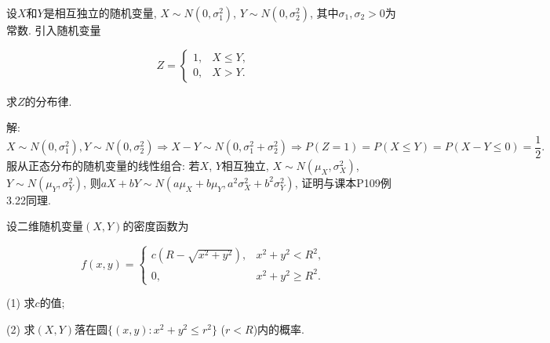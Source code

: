 \documentclass[standard]{ExBook}
\begin{document}
\begin{qitems}
    \begin{bbox}
    \begin{shaded}
        \qitem
设$X$和$Y$是相互独立的随机变量, $X\sim N(0,\sigma_{1}^{2})$, $Y\sim N(0,\sigma_{2}^{2})$, 其中$\sigma_{1},\sigma_{2}>0$为常数. 引入随机变量
\vspace{-2em}
\begin{center}
\begin{equation}
    Z=
    \left\{
    \begin{array}{cl}
        \nonumber
        1, &X\leq Y,\\
        0, &X>Y.
    \end{array}
    \right.
\end{equation}
\end{center}
求$Z$的分布律.
    \end{shaded}
    \end{bbox}

\vspace{-5em}

    \begin{bbox}
解: 
$$X\sim N(0,\sigma_{1}^{2}), Y\sim N(0,\sigma_{2}^{2}) \Longrightarrow X-Y\sim N(0,\sigma_{1}^{2}+\sigma_{2}^{2}) \Longrightarrow P(Z=1)=P(X\leq Y)=P(X-Y\leq 0)=\frac{1}{2}.$$
\textcolor{themeColor}{\selectfont {} 服从正态分布的随机变量的线性组合: 若$X$, $Y$相互独立, $X\sim N(\mu_{X},\sigma_{X}^{2})$, $Y\sim N(\mu_{Y},\sigma_{Y}^{2})$, 则$aX+bY\sim N(a\mu_{X}+b\mu_{Y}, a^2 \sigma_{X}^{2}+b^2 \sigma_{Y}^{2})$, 证明与课本P109例3.22同理.}
    \end{bbox}

\vspace{-5em}

    \begin{bbox}
    \begin{shaded}
        \qitem
设二维随机变量$(X,Y)$的密度函数为
\vspace{-2em}
\begin{center}
\begin{equation}
    f(x,y)=
    \left\{
    \begin{array}{cl}
        \nonumber
        c(R-\sqrt{x^2+y^2}), & x^2+y^2<R^2,\\
        0, & x^2+y^2\geq R^2.
    \end{array}
    \right.
\end{equation}
\end{center}
(1) 求$c$的值;

(2) 求$(X,Y)$落在圆$\{(x,y):x^2+y^2\leq r^2\}$ ($r<R$)内的概率.
    \end{shaded}
    \end{bbox}


\end{qitems}
\end{document}

